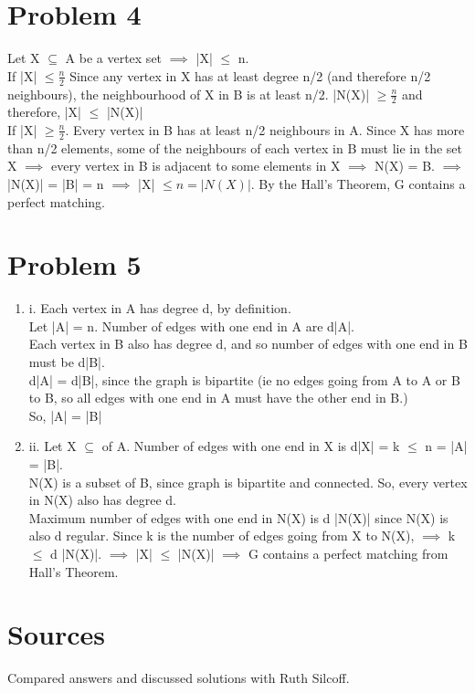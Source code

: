 \documentclass[english]{article}
\begin{document}
\section*{Problem 4}
Let X $\subseteq$ A be a vertex set $\implies$ |X| $\leq$ n. \\ If |X| $\leq \frac{n}{2}$ Since any vertex in X has at least degree n/2 (and therefore n/2 neighbours), the neighbourhood of X in B is at least n/2. |N(X)| $\geq \frac{n}{2}$ and therefore, |X| $\leq$ |N(X)|
\\ If |X| $\geq \frac{n}{2}$. Every vertex in B has at least n/2 neighbours in A. Since X has more than n/2 elements, some of the neighbours of each vertex in B must lie in the set X $\implies$ every vertex in B is adjacent to some elements in X $\implies$ N(X) = B. $\implies$ |N(X)| = |B| = n $\implies$ |X| $\leq n = |N(X)|$. By the Hall's Theorem, G contains a perfect matching.
\section*{Problem 5}
\begin{enumerate} [label=\alph*]
\item i.  Each vertex in A has degree d, by definition. \\ Let |A| = n. Number of edges with one end in A are d|A|.
\\ Each vertex in B also has degree d, and so number of edges with one end in B must be d|B|. 
\\ d|A| = d|B|, since the graph is bipartite (ie no edges going from A to A or B to B, so all edges with one end in A must have the other end in B.)
\\ So, |A| = |B|
\item ii.  Let X $\subseteq$ of A. Number of edges with one end in X is d|X| = k $\leq$ n = |A| = |B|.
\\ N(X) is a subset of B, since graph is bipartite and connected. So, every vertex in N(X) also has degree d. \\ Maximum number of edges with one end in N(X) is d |N(X)| since N(X) is also d regular. Since k is the number of edges going from X to N(X), $\implies$ k $\leq$ d |N(X)|. $\implies$ |X| $\leq$ |N(X)| $\implies$ G contains a perfect matching from Hall's Theorem. 
\end{enumerate}
\section*{Sources}
Compared answers and discussed solutions with Ruth Silcoff.
\end{document}
